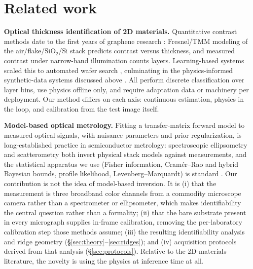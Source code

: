 \documentclass[10pt]{article}
\begin{document}
\section{Related work}


\textbf{Optical thickness identification of 2D materials.} Quantitative contrast methods date to the first years of graphene research \cite{blake2007,ni2007}: Fresnel/TMM modeling of the air/flake/SiO$_2$/Si stack predicts contrast versus thickness, and measured contrast under narrow-band illumination counts layers. Learning-based systems scaled this to automated wafer search \cite{masubuchi2020,uslu2024gmm}, culminating in the physics-informed synthetic-data systems discussed above \cite{uslu2024maskterial,phiadapt2025,cliff2026,qupaint2026}. All perform discrete classification over layer bins, use physics offline only, and require adaptation data or machinery per deployment. Our method differs on each axis: continuous estimation, physics in the loop, and calibration from the test image itself.

\textbf{Model-based optical metrology.} Fitting a transfer-matrix forward model to measured optical signals, with nuisance parameters and prior regularization, is long-established practice in semiconductor metrology: spectroscopic ellipsometry \cite{azzam1977,tompkins2005} and scatterometry \cite{raymond2001} both invert physical stack models against measurements, and the statistical apparatus we use (Fisher information, Cram\'er--Rao and hybrid Bayesian bounds, profile likelihood, Levenberg--Marquardt) is standard \cite{vantrees1968,kay1993,murphy2000,levenberg1944,marquardt1963}. Our contribution is not the idea of model-based inversion. It is (i) that the measurement is three broadband color channels from a commodity microscope camera rather than a spectrometer or ellipsometer, which makes identifiability the central question rather than a formality; (ii) that the bare substrate present in every micrograph supplies in-frame calibration, removing the per-laboratory calibration step those methods assume; (iii) the resulting identifiability analysis and ridge geometry (\S\ref{sec:theory}--\ref{sec:ridges}); and (iv) acquisition protocols derived from that analysis (\S\ref{sec:protocols}). Relative to the 2D-materials literature, the novelty is using the physics at inference time at all.
\end{document}
